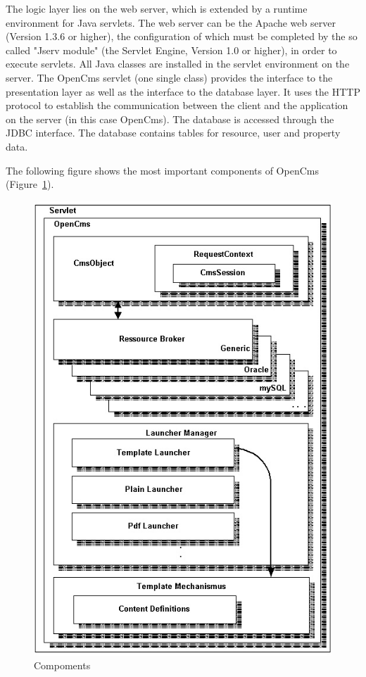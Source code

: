 The logic layer lies on the web server, which is extended by a runtime
environment for Java servlets. The web server can be the Apache web
server (Version 1.3.6 or higher), the configuration of which must be
completed by the so called "Jserv module" (the Servlet Engine,
Version 1.0 or higher), in order to execute servlets. All Java classes
are installed in the servlet environment on the server.
The OpenCms servlet (one single class) provides the interface to the
presentation layer as well as the interface to the database layer. It
uses the HTTP protocol to establish the communication between the
client and the application on the server (in this case OpenCms).
The database is accessed through the JDBC interface. The database
contains tables for resource, user and property data.

The following figure shows the most important components of OpenCms 
(Figure~\ref {Components}).\\

\begin{figure}
\begin{center}
\includegraphics[clip,width=0.7 \linewidth]{pics/modules/2}
\end{center}
\caption[Components]{Compoments}
\label{Components}
\end{figure}


